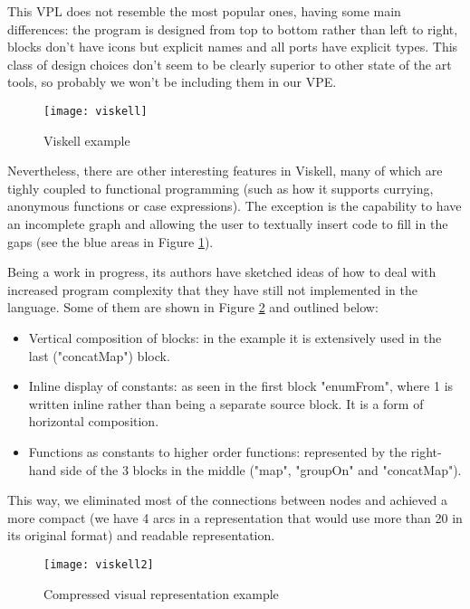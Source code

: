 \begin{itemsize}
This VPL does not resemble the most popular ones, having some main differences:
the program is designed from top to bottom rather than left to right, blocks
don't have icons but explicit names and all ports have explicit types. This class
of design choices don't seem to be clearly superior to other state of the art tools,
so probably we won't be including them in our VPE.

\begin{figure}[t]
  \begin{center}
    \leavevmode
    \texttt{[image: viskell]}
    \caption{Viskell example \cite{viskell}}
    \label{fig:viskell}
  \end{center}
\end{figure}

Nevertheless, there are other interesting features in Viskell, many of which
are tighly coupled to functional programming (such as how it supports currying,
anonymous functions or case expressions). The exception is the capability to
have an incomplete graph and allowing the user to textually insert code to fill
in the gaps (see the blue areas in Figure \ref{fig:viskell}).

Being a work in progress, its authors have sketched ideas of how to deal with
increased program complexity that they have still not implemented in the language.
Some of them are shown in Figure \ref{fig:viskell2} and outlined below:

\begin{itemize}
  \item Vertical composition of blocks: in the example it is extensively used
in the last ("concatMap") block.
  \item Inline display of constants: as seen in the first block "enumFrom",
where 1 is written inline rather than being a separate source block. It is a form
of horizontal composition.
  \item Functions as constants to higher order functions: represented by the
right-hand side of the 3 blocks in the middle ("map", "groupOn" and "concatMap").
\end{itemize}

This way, we eliminated most of the connections between nodes and achieved a
more compact (we have 4 arcs in a representation that would use more than 20 in
its original format) and readable representation.

\begin{figure}[t]
  \begin{center}
    \leavevmode
    \texttt{[image: viskell2]}
    \caption{Compressed visual representation example \cite{viskell2}}
    \label{fig:viskell2}
  \end{center}
\end{figure}


\end{itemsize}
